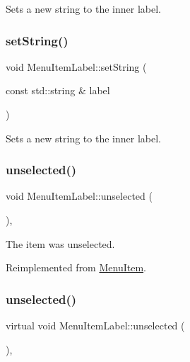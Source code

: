Sets a new string to the inner label. \mbox{\label{classMenuItemLabel_a792525a9b4ca9f196bb670ec849b7e42}} 
\subsubsection{\texorpdfstring{set\+String()}{setString()}\hspace{0.1cm}{\footnotesize\ttfamily [2/2]}}
{\footnotesize\ttfamily void Menu\+Item\+Label\+::set\+String (\begin{DoxyParamCaption}\item[{const std\+::string \&}]{label }\end{DoxyParamCaption})}

Sets a new string to the inner label. \mbox{\label{classMenuItemLabel_ac2cc529a524150093ba996f90f150267}} 
\subsubsection{\texorpdfstring{unselected()}{unselected()}\hspace{0.1cm}{\footnotesize\ttfamily [1/2]}}
{\footnotesize\ttfamily void Menu\+Item\+Label\+::unselected (\begin{DoxyParamCaption}{ }\end{DoxyParamCaption})\hspace{0.3cm}{\ttfamily [override]}, {\ttfamily [virtual]}}

The item was unselected. 

Reimplemented from \hyperlink{classMenuItem_a3abeecc6d59ada50f4123e3e36ae4892}{Menu\+Item}.

\mbox{\label{classMenuItemLabel_a1932cfa5621f3f8a9ce74f374aab04cd}} 
\subsubsection{\texorpdfstring{unselected()}{unselected()}\hspace{0.1cm}{\footnotesize\ttfamily [2/2]}}
{\footnotesize\ttfamily virtual void Menu\+Item\+Label\+::unselected (\begin{DoxyParamCaption}{ }\end{DoxyParamCaption})\hspace{0.3cm}{\ttfamily [override]}, {\ttfamily [virtual]}}

